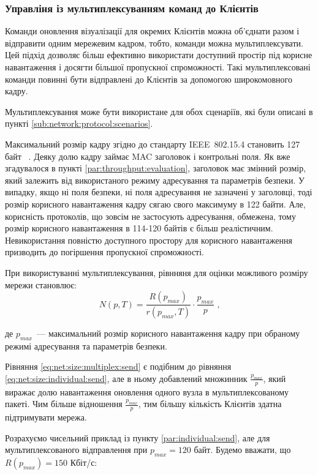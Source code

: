 \documentclass[a4paper,ukrainian,utf8,nocolumnsxix,floatsection,equationsection]{eskdtext}
\renewcommand\paragraph{\subsubsection}
\newcommand{\iee}[0]{IEEE~802.15.4\xspace}
\begin{document}
\paragraph{Управліня із мультиплексуванням команд до Клієнтів}

Команди оновлення візуалізації для окремих Клієнтів можна об’єднати разом і відправити одним мережевим кадром, тобто, команди можна мультиплексувати. Цей підхід дозволяє більш ефективно використати доступний простір під корисне навантаження і досягти більшої пропускної спроможності. Такі мультиплексовані команди повинні бути відправлені до Клієнтів за допомогою широкомовного кадру.

Мультиплексування може бути використане для обох сценаріїв, які були описані в пункті \ref{sub:network:protocol:scenarios}.

Максимальний розмір кадру згідно до стандарту \iee становить 127 байт ~\cite{ieee:802:15:4:2011}. Деяку долю кадру займає MAC заголовок і контрольні поля. Як вже згадувалося в пункті \ref{par:throughput:evaluation}, заголовок має змінний розмір, який залежить від використаного режиму адресування та параметрів безпеки. У випадку, якщо ні поля безпеки, ні поля адресування не зазначені у заголовці, тоді розмір корисного навантаження кадру сягаю свого максимуму в 122 байти. Але, корисність протоколів, що зовсім не застосують адресування, обмежена, тому розмір корисного навантаження в 114-120 байтів є більш реалістичним. Невикористання повністю доступного простору для корисного навантаження призводить до погіршення пропускної спроможності.

При використуванні мультиплексування, рівнняня для оцінки можливого розміру мережи становлює:
\begin{equation}\label{eq:net:size:multiplex:send}
	N(p, T) = \frac{R(p_{max})}{r(p_{max}, T)} \cdot \frac{p_{max}}{p} \text{ ,}
\end{equation}

де $p_{max}$~--- максимальний розмір корисного навантаження кадру при обраному режимі адресування та параметрів безпеки.

Рівняння \ref{eq:net:size:multiplex:send} є подібним до рівняння \ref{eq:net:size:individual:send}, але в ньому добавлений множинник $\frac{p_{max}}{p}$, який виражає долю навантаження оновлення одного вузла в мультиплексованому пакеті. Чим більше відношення $\frac{p_{max}}{p}$, тим більшу кількість Клієнтів здатна підтримувати мережа.

Розрахуємо чисельний приклад із пункту \ref{par:individual:send}, але для мультиплексованого відправлення при $p_{max} = 120$ байт. Будемо вважати, що $R(p_{max}) = 150$ Кбіт/с:
\end{document}
